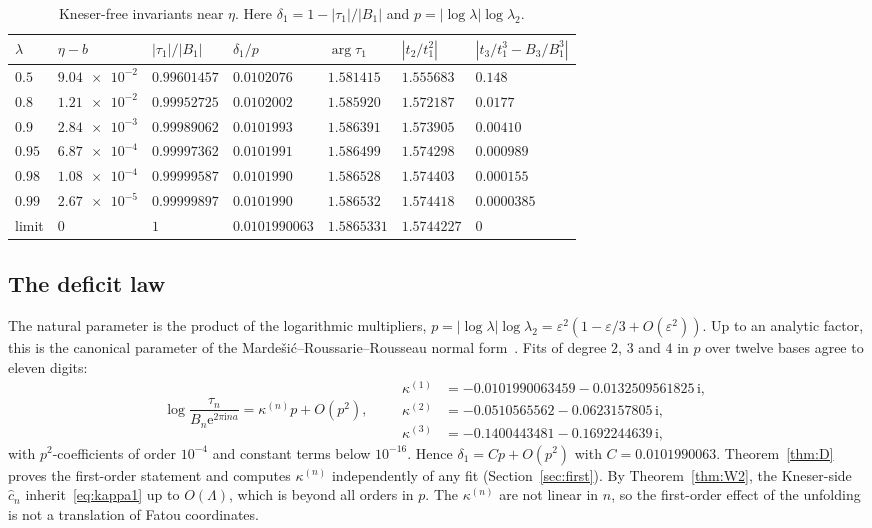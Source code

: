 \documentclass[11pt]{amsart}
\theoremstyle{definition}
\newcommand{\eee}{\mathrm{e}}
\newcommand{\ii}{\mathrm{i}}
\begin{document}
\begin{table}[htbp]
\centering
\caption{Kneser-free invariants near $\eta$.  Here $\delta_1=1-|\tau_1|/|B_1|$
and $p=|\log\lambda|\log\lambda_2$.}
\label{tab:eta}
\small\setlength{\tabcolsep}{4pt}
\begin{tabular}{lllllll}
\toprule
$\lambda$ & $\eta-b$ & $|\tau_1|/|B_1|$ & $\delta_1/p$ & $\arg\tau_1$ & $|t_2/t_1^2|$ & $|t_3/t_1^3-B_3/B_1^3|$\\
\midrule
$0.5$ & $\num{9.04e-2}$ & $0.99601457$ & $0.0102076$ & $1.581415$ & $1.555683$ & $0.148$\\
$0.8$ & $\num{1.21e-2}$ & $0.99952725$ & $0.0102002$ & $1.585920$ & $1.572187$ & $0.0177$\\
$0.9$ & $\num{2.84e-3}$ & $0.99989062$ & $0.0101993$ & $1.586391$ & $1.573905$ & $0.00410$\\
$0.95$ & $\num{6.87e-4}$ & $0.99997362$ & $0.0101991$ & $1.586499$ & $1.574298$ & $0.000989$\\
$0.98$ & $\num{1.08e-4}$ & $0.99999587$ & $0.0101990$ & $1.586528$ & $1.574403$ & $0.000155$\\
$0.99$ & $\num{2.67e-5}$ & $0.99999897$ & $0.0101990$ & $1.586532$ & $1.574418$ & $0.0000385$\\
\midrule
limit & $0$ & $1$ & $0.0101990063$ & $1.5865331$ & $1.5744227$ & $0$\\
\bottomrule
\end{tabular}
\end{table}

\subsection{The deficit law}\label{sec:deficit}
The natural parameter is the product of the logarithmic multipliers,
$p=|\log\lambda|\log\lambda_2=\varepsilon^2(1-\varepsilon/3+O(\varepsilon^2))$.  Up to an analytic
factor, this is the canonical parameter of the
Marde\v{s}i\'c--Roussarie--Rousseau normal form~\cite{MRR2004}.  Fits of degree
$2$, $3$ and $4$ in $p$ over twelve bases agree to eleven digits:
\begin{equation}\label{eq:kappa1}
 \log\frac{\tau_n}{B_n\eee^{2\pi\ii na}}=\kappa^{(n)}p+O(p^2),\qquad
 \begin{aligned}
 \kappa^{(1)}&=-0.0101990063459-0.0132509561825\,\ii,\\
 \kappa^{(2)}&=-0.0510565562-0.0623157805\,\ii,\\
 \kappa^{(3)}&=-0.1400443481-0.1692244639\,\ii,
 \end{aligned}
\end{equation}
with $p^2$-coefficients of order $10^{-4}$ and constant terms below
$10^{-16}$.  Hence $\delta_1=Cp+O(p^2)$ with $C=0.0101990063$.  Theorem~\ref{thm:D}
proves the first-order statement and computes $\kappa^{(n)}$ independently of any
fit (Section~\ref{sec:first}).  By
Theorem~\ref{thm:W2}, the Kneser-side $\hat c_n$ inherit~\eqref{eq:kappa1} up to
$O(\Lambda)$, which is beyond all orders in $p$.  The $\kappa^{(n)}$ are not linear
in $n$, so the first-order effect of the unfolding is not a translation of Fatou
coordinates.
\end{document}
